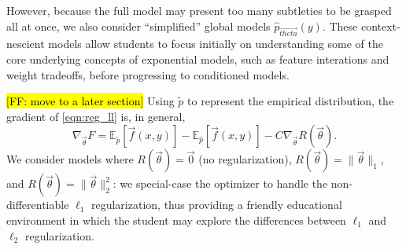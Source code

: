 \documentclass[11pt,letterpaper]{article}
\newcommand{\Note}[1]{}
\renewcommand{\Note}[1]{\hl{[#1]}}
\newcommand{\NoteSigned}[3]{{\sethlcolor{#2}\Note{#1: #3}}}
\newcommand{\NoteFF}[1]{\NoteSigned{FF}{LightBlue}{#1}}
\begin{document}
However, because the full model may present too many subtleties to be grasped all at once, we also consider ``simplified'' global models $\hat{p}_{\vec{theta}}\left(y\right)$. These context-nescient models allow students to focus initially on understanding some of the core underlying concepts of exponential models, such as feature interations and weight tradeoffs, before progressing to conditioned models.

\NoteFF{move to a later section} Using $\tilde{p}$ to represent the empirical distribution, the gradient of \eqref{eqn:reg_ll} is, in general,
\begin{equation}
\nabla_{\vec{\theta}} F = 
\mathbb{E}_{\tilde{p}}\left[\vec{f}(x,y)\right] 
- \mathbb{E}_{\hat{p}}\left[\vec{f}(x,y)\right]
- C \nabla_{\vec{\theta}}R(\vec{\theta}).
\end{equation}
We consider models where $R(\vec{\theta}) = \vec{0}$ (no regularization), $R(\vec{\theta}) = \|\vec\theta\|_1$, and $R(\vec{\theta}) = \|\vec{\theta}\|_2^2$: we special-case the optimizer to handle the non-differentiable $\ell_1$ regularization, thus providing a friendly educational environment in which the student may explore the differences between $\ell_1$ and $\ell_2$ regularization.
\end{document}
